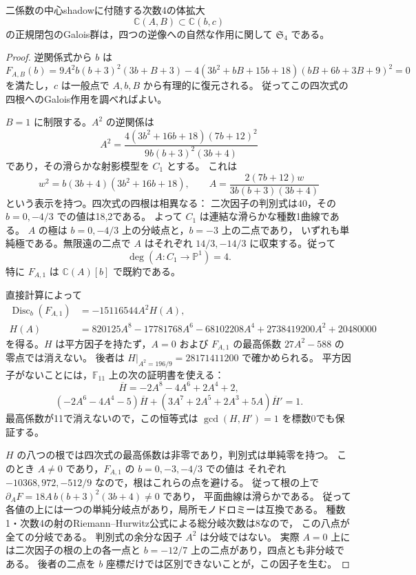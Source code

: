 \begin{proposition}[係数比較の幾何学的モノドロミー]
\label{prop:binary-shadow-geometric-sfour}
二係数の中心shadowに付随する次数4の体拡大
\[
 \mathbb C(A,B)\subset\mathbb C(b,c)
\]
の正規閉包のGalois群は，四つの逆像への自然な作用に関して
$\mathfrak S_4$ である。
\end{proposition}
\begin{proof}
逆関係式から $b$ は
\[
 F_{A,B}(b)=
 9A^2b(b+3)^2(3b+B+3)
 -4(3b^2+bB+15b+18)(bB+6b+3B+9)^2=0
\]
を満たし，$c$ は一般点で $A,b,B$ から有理的に復元される。
従ってこの四次式の四根へのGalois作用を調べればよい。

$B=1$ に制限する。$A^2$ の逆関係は
\[
 A^2=\frac{4(3b^2+16b+18)(7b+12)^2}
 {9b(b+3)^2(3b+4)}
\]
であり，その滑らかな射影模型を $C_1$ とする。
これは
\[
 w^2=b(3b+4)(3b^2+16b+18),\qquad
 A=\frac{2(7b+12)w}{3b(b+3)(3b+4)}
\]
という表示を持つ。四次式の四根は相異なる：
二次因子の判別式は40，その $b=0,-4/3$ での値は18,2である。
よって $C_1$ は連結な滑らかな種数1曲線である。
$A$ の極は $b=0,-4/3$ 上の分岐点と，$b=-3$ 上の二点であり，
いずれも単純極である。無限遠の二点で $A$ はそれぞれ
$14/3,-14/3$ に収束する。従って
\[
                       \deg(A:C_1\longrightarrow\mathbb P^1)=4.
\]
特に $F_{A,1}$ は $\mathbb C(A)[b]$ で既約である。

直接計算によって
\begin{align}
 \operatorname{Disc}_b(F_{A,1})
   &=-15116544A^2H(A),\\
 H(A)&=820125A^8-17781768A^6-68102208A^4
                     +2738419200A^2+20480000
\end{align}
を得る。$H$ は平方因子を持たず，$A=0$ および
$F_{A,1}$ の最高係数 $27A^2-588$ の零点では消えない。
後者は $H|_{A^2=196/9}=28171411200$ で確かめられる。
平方因子がないことには，$\mathbb F_{11}$ 上の次の証明書を使える：
\[
 \overline H=-2A^8-4A^6+2A^4+2,
\]
\[
 (-2A^6-4A^4-5)\overline H
 +(3A^7+2A^5+2A^3+5A)\overline H'=1.
\]
最高係数が11で消えないので，この恒等式は
$\gcd(H,H')=1$ を標数0でも保証する。

$H$ の八つの根では四次式の最高係数は非零であり，判別式は単純零を持つ。
このとき $A\ne0$ であり，$F_{A,1}$ の $b=0,-3,-4/3$ での値は
それぞれ $-10368,972,-512/9$ なので，根はこれらの点を避ける。
従って根の上で $\partial_AF=18A\,b(b+3)^2(3b+4)\ne0$ であり，
平面曲線は滑らかである。
従って各値の上には一つの単純分岐点があり，局所モノドロミーは互換である。
種数1・次数4の射のRiemann--Hurwitz公式\cite[Tag 0C1B]{StacksProject}による総分岐次数は8なので，
この八点が全ての分岐である。
判別式の余分な因子 $A^2$ は分岐ではない。
実際 $A=0$ 上には二次因子の根の上の各一点と
$b=-12/7$ 上の二点があり，四点とも非分岐である。
後者の二点を $b$ 座標だけでは区別できないことが，この因子を生む。


\end{proof}
